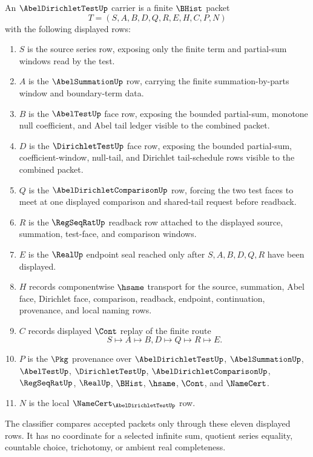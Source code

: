 \begin{definition}
\label{def:abel-dirichlet-test-carrier}
An $\AbelDirichletTestUp$ carrier is a finite $\BHist$ packet
$$
T=(S,A,B,D,Q,R,E,H,C,P,N)
$$
with the following displayed rows:
\begin{enumerate}
\item $S$ is the source series row, exposing only the finite term and partial-sum windows read by the test.
\item $A$ is the $\AbelSummationUp$ row, carrying the finite summation-by-parts window and boundary-term data.
\item $B$ is the $\AbelTestUp$ face row, exposing the bounded partial-sum, monotone null coefficient, and Abel tail ledger visible to the combined packet.
\item $D$ is the $\DirichletTestUp$ face row, exposing the bounded partial-sum, coefficient-window, null-tail, and Dirichlet tail-schedule rows visible to the combined packet.
\item $Q$ is the $\AbelDirichletComparisonUp$ row, forcing the two test faces to meet at one displayed comparison and shared-tail request before readback.
\item $R$ is the $\RegSeqRatUp$ readback row attached to the displayed source, summation, test-face, and comparison windows.
\item $E$ is the $\RealUp$ endpoint seal reached only after $S,A,B,D,Q,R$ have been displayed.
\item $H$ records componentwise $\hsame$ transport for the source, summation, Abel face, Dirichlet face, comparison, readback, endpoint, continuation, provenance, and local naming rows.
\item $C$ records displayed $\Cont$ replay of the finite route
$$
S \longmapsto A \longmapsto B,D \longmapsto Q \longmapsto R \longmapsto E.
$$
\item $P$ is the $\Pkg$ provenance over $\AbelDirichletTestUp$, $\AbelSummationUp$, $\AbelTestUp$, $\DirichletTestUp$, $\AbelDirichletComparisonUp$, $\RegSeqRatUp$, $\RealUp$, $\BHist$, $\hsame$, $\Cont$, and $\NameCert$.
\item $N$ is the local $\NameCert_{\AbelDirichletTestUp}$ row.
\end{enumerate}
The classifier compares accepted packets only through these eleven displayed rows. It has no coordinate for a selected infinite sum, quotient series equality, countable choice, trichotomy, or ambient real completeness.
\end{definition}

